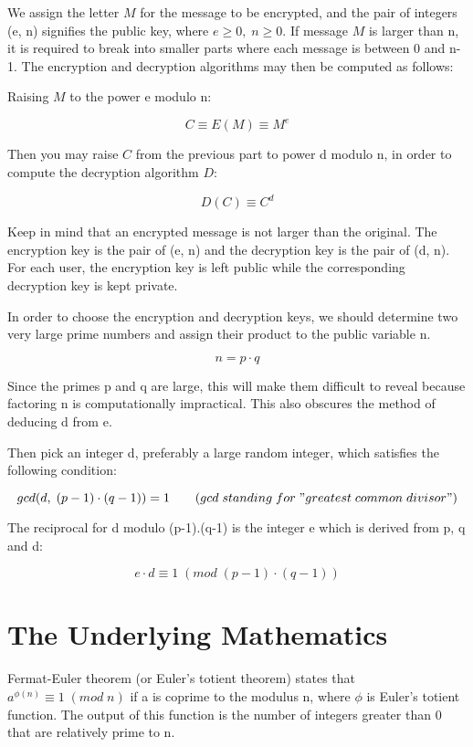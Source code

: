 \documentclass[12pt, letterpaper]{article}
\begin{document}
We assign the letter $M$ for the message to be encrypted, and the pair of integers (e, n) signifies the public key, where $e \geq 0, \; n \geq 0$. If message $M$ is larger than n, it is required to break into smaller parts where each message is between 0 and n-1. The encryption and decryption algorithms may then be computed as follows:

Raising $M$ to the power e modulo n:

\[ C \equiv E(M) \equiv M^e \]

Then you may raise $C$ from the previous part to power d modulo n, in order to compute the decryption algorithm $D$:
	
\[ D(C) \equiv C^d \] 

Keep in mind that an encrypted message is not larger than the original. The encryption key is the pair of (e, n) and the decryption key is the pair of (d, n). For each user, the encryption key is left public while the corresponding decryption key is kept private. 

In order to choose the encryption and decryption keys, we should determine two very large prime numbers and assign their product to the public variable n. 

\[ n = p \cdot q \]

Since the primes p and q are large, this will make them difficult to reveal because factoring n is computationally impractical. This also obscures the method of deducing d from e.

Then pick an integer d, preferably a large random integer, which satisfies the following condition:

\[ gcd(d, \; (p-1) \cdot (q-1)) = 1  \qquad (gcd \; standing \; for \; "greatest \; common \; divisor") \]
	
The reciprocal for d modulo (p-1).(q-1) is the integer e which is derived from p, q and d:

\begin{equation}
e \cdot d \equiv 1 \; (mod \; (p-1) \cdot (q-1))
\end{equation}

\section{The Underlying Mathematics}

Fermat-Euler theorem (or Euler’s totient theorem) states that $a^{\phi(n)} \equiv 1 \; (mod \; n)$ if a is coprime to the modulus n, where $\phi$ is Euler's totient function. The output of this function is the number of integers greater than 0 that are relatively prime to n.
\end{document}
